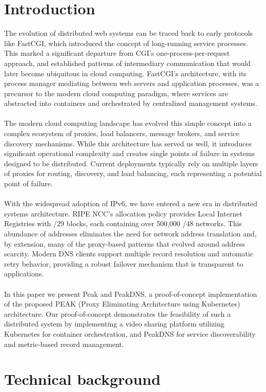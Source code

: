 \documentclass[12pt]{article}
\begin{document}
\section{Introduction}
The evolution of distributed web systems can be traced back to early protocols like FastCGI, which introduced the concept of long-running service processes.
This marked a significant departure from CGI's one-process-per-request approach,
and established patterns of intermediary communication that would later become ubiquitous in cloud computing.
FastCGI's architecture, with its process manager mediating between web servers and application processes, was a precursor to the modern cloud computing paradigm,
where services are abstracted into containers and orchestrated by centralized management systems.
\\
\\
The modern cloud computing landscape has evolved this simple concept into a complex ecosystem of proxies,
load balancers, message brokers, and service discovery mechanisms. While this architecture has served us well, it introduces
significant operational complexity and creates single points of failure in systems designed to be distributed.
Current deployments typically rely on multiple layers of proxies for routing, discovery, and load balancing, each representing
a potential point of failure.
\\
\\
With the widespread adoption of IPv6, we have entered a new era in distributed systems architecture. RIPE NCC's allocation policy
provides Local Internet Registries with /29 blocks, each containing over 500,000 /48 networks. This abundance of addresses eliminates
the need for network address translation and, by extension, many of the proxy-based patterns that evolved around address scarcity.
Modern DNS clients support multiple record resolution and automatic retry behavior, providing a robust failover mechanism that is 
transparent to applications.
\\
\\
In this paper we present Peak and PeakDNS, a proof-of-concept implementation of the proposed PEAK (Proxy Eliminating Architecture using Kubernetes) architecture.
Our proof-of-concept demonstrates the feasibility of such a distributed system by implementing 
a video sharing platform utilizing Kubernetes for container orchestration,
and PeakDNS for service discoverability and metric-based record management.


\section{Technical background}
\end{document}
